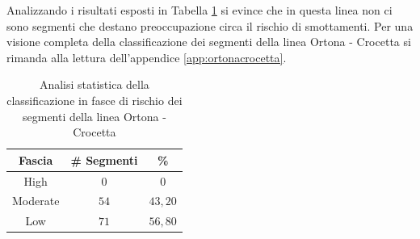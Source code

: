 \newline
Analizzando i risultati esposti in Tabella \ref{percentualeortonacrocetta} si evince che in questa linea non ci sono segmenti che destano preoccupazione circa il rischio di smottamenti. 
Per una visione completa della classificazione dei segmenti della linea Ortona - Crocetta si rimanda alla lettura dell'appendice \ref{app:ortonacrocetta}.
\begin{table}[h]
\centering
\begin{tabular}{|c|c|c|}
\hline \rowcolor{lightgray}
Fascia   & \# Segmenti & \%    \\ \hline \rowcolor{flamingopink}
High     & $0$           & $0$     \\ \hline \rowcolor{icterine}
Moderate & $54$          & $43,20$ \\ \hline \rowcolor{inchworm}
Low      & $71$          & $56,80$ \\ \hline
\end{tabular}
\caption{Analisi statistica della classificazione in fasce di rischio dei segmenti della linea Ortona - Crocetta}
\label{percentualeortonacrocetta}
\end{table}

 